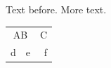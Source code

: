 \documentclass{article}
\begin{document}
Text before.
\hline
More text.

\begin{tabular}{|l|c|r|}
\multicolumn{2}{|c|}{AB} & C \\
d & e & f \\
\end{tabular}
\end{document}
